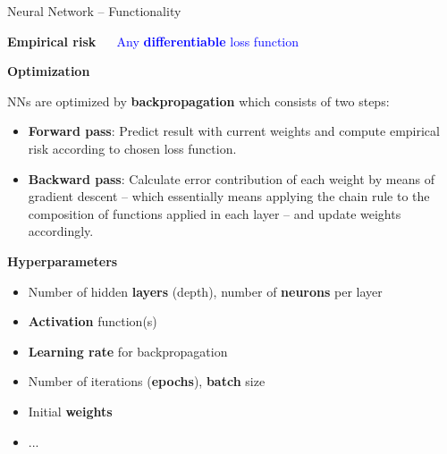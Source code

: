 \documentclass[11pt,compress,t,notes=noshow, xcolor=table]{beamer}
\newcommand{\highlight}[1]{\textcolor{highlightcol}{\textbf{#1}}}
\begin{document}

\begin{frame}{Neural Network -- Functionality}

\footnotesize

\highlight{Empirical risk} ~~
\textcolor{blue}{Any \textbf{differentiable} loss function}

\medskip

\highlight{Optimization}

NNs are optimized by \textbf{backpropagation} which consists of two steps:
\begin{itemize}
  \item \textbf{Forward pass}: Predict result with current weights and 
  compute empirical risk according to chosen loss function. 
  \item \textbf{Backward pass}: Calculate error contribution of each weight by 
  means of gradient descent -- which essentially means applying the chain rule
  to the composition of functions applied in each layer -- and update weights 
  accordingly. 
\end{itemize}

\medskip

\highlight{Hyperparameters}

\begin{itemize}
  \item Number of hidden \textbf{layers} (depth), number of \textbf{neurons} 
  per layer
  \item \textbf{Activation} function(s)
  \item \textbf{Learning rate} for backpropagation
  \item Number of iterations (\textbf{epochs}), \textbf{batch} size
  \item Initial \textbf{weights} 
  \item ...
\end{itemize}

\medskip


\end{frame}

\end{document}
